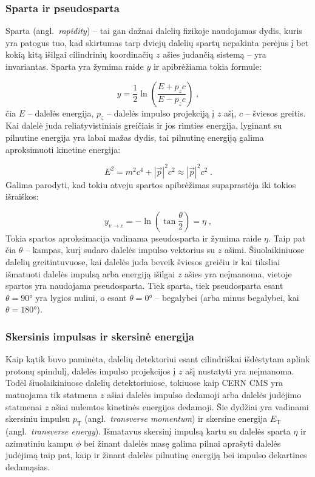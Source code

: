 \documentclass[a4paper, 12pt]{article}
\newcommand{\pT}{p_{\mathrm{T}}}
\newcommand{\ET}{E_{\mathrm{T}}}
\newlength\q
\begin{document}
\subsubsection*{Sparta ir pseudosparta}

Sparta (angl.\ \textit{rapidity}) -- tai gan dažnai dalelių fizikoje naudojamas dydis, kuris yra patogus tuo,
kad skirtumas tarp dviejų dalelių spartų nepakinta perėjus į bet kokią kitą išilgai cilindrinių koordinačių
$z$ ašies judančią sistemą -- yra invariantas.
Sparta yra žymima raide $y$ ir apibrėžiama tokia formule:

\begin{equation}
	y = \frac{1}{2} \ln{ \left( \frac{E+p_{z}c}{E-p_{z}c} \right) } \; \mathrm{,}
	\label{eq:rapidity}
\end{equation}
čia $E$ -- dalelės energija, $p_{z}$ -- dalelės impulso projekciją į $z$ ašį, $c$ -- šviesos greitis.
Kai dalelė juda reliatyvistiniais greičiais ir jos rimties energija, lyginant su pilnutine energija yra labai
mažas dydis, tai pilnutinę energiją galima aproksimuoti kinetine energija:

\begin{equation}
	E^2 = m^2c^4 + |\vec{p}|^2c^2 \approx |\vec{p}|^2c^2 \; .
	\label{eq:relEnergy}
\end{equation}
Galima parodyti, kad tokiu atveju spartos apibrėžimas supaprastėja iki tokios išraiškos:

\begin{equation}
	y_{v\rightarrow c} = -\ln \left( \tan \frac{\theta}{2} \right) = \eta \; \mathrm{,}
	\label{eq:pseudorapidity}
\end{equation}
Tokia spartos aproksimacija vadinama pseudosparta ir žymima raide $\eta$.
Taip pat čia $\theta$ -- kampas, kurį sudaro dalelės impulso vektorius su $z$ ašimi.
Šiuolaikiniuose dalelių greitintuvuose, kai dalelės juda beveik šviesos greičiu ir kai tiksliai
išmatuoti dalelės impulsą arba energiją išilgai $z$ ašies yra neįmanoma, vietoje spartos
yra naudojama pseudosparta.
Tiek sparta, tiek pseudosparta esant $\theta=\ang{90}$ yra lygios nuliui, o esant $\theta=\ang{0}$ --
begalybei (arba minus begalybei, kai $\theta=\ang{180}$).


\subsubsection*{Skersinis impulsas ir skersinė energija}

Kaip kątik buvo paminėta, dalelių detektoriui esant cilindriškai išdėstytam aplink protonų spindulį,
dalelės impulso projekcijos į $z$ ašį nustatyti yra neįmanoma.
Todėl šiuolaikiniuose dalelių detektoriuiose, tokiuose kaip CERN CMS yra matuojama tik statmena $z$
ašiai dalelės impulso dedamoji arba dalelės judėjimo statmenai $z$ ašiai nulemtos kinetinės energijos
dedamoji.
Šie dydžiai yra vadinami skersiniu impulsu $\pT$ (angl.\ \textit{transverse momentum}) ir
skersine energija $\ET$ (angl.\ \textit{transverse energy}).
Išmatavus skersinį impulsą kartu su dalelės sparta $\eta$ ir azimutiniu kampu $\phi$ bei žinant dalelės
masę galima pilnai aprašyti dalelės judėjimą taip pat, kaip ir žinant dalelės pilnutinę energiją bei
impulso dekartines dedamąsias.
\end{document}
